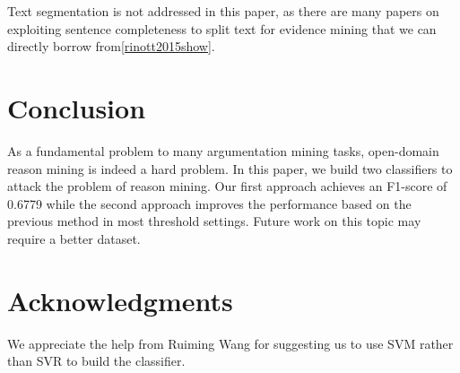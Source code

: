 \documentclass[11pt,a4paper]{article}
\begin{document}
Text segmentation is not addressed in this paper, as there are many papers on exploiting sentence completeness to split text for evidence mining that we can directly borrow from\ref{rinott2015show}.

\section{Conclusion}
\label{sec:conclusion}

As a fundamental problem to many argumentation mining tasks, open-domain reason mining is indeed a hard problem. In this paper, we build two classifiers to attack the problem of reason mining. Our first approach achieves an F1-score of 0.6779 while the second approach improves the performance based on the previous method in most threshold settings. Future work on this topic may require a better dataset.

\section*{Acknowledgments}

We appreciate the help from Ruiming Wang for suggesting us to use SVM rather than SVR to build the classifier. 

% 
%


\end{document}
